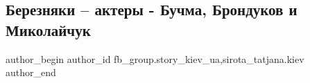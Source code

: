  
 
 
 
 
 
\subsection{Березняки – актеры - Бучма, Брондуков и Миколайчук}
\label{sec:06_11_2021.fb.fb_group.story_kiev_ua.1.bereznjaki_aktery_buchma_brondukov_mykolajchuk}
 
\ifcmt
 author_begin
   author_id fb_group.story_kiev_ua,sirota_tatjana.kiev
 author_end
\fi

